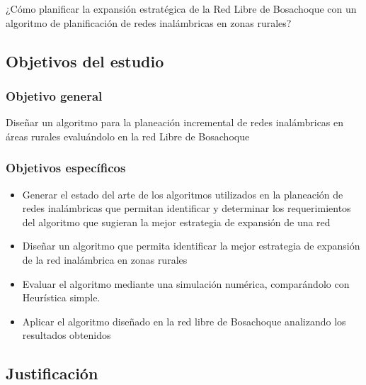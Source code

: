 \documentclass[]{article}
\begin{document}
¿Cómo planificar la expansión estratégica de la Red Libre de Bosachoque
con un algoritmo de planificación de redes inalámbricas en zonas
rurales?

\subsection{Objetivos del estudio}\label{objetivos-del-estudio}

\subsubsection{Objetivo general}\label{objetivo-general}

Diseñar un algoritmo para la planeación incremental de redes
inalámbricas en áreas rurales evaluándolo en la red Libre de Bosachoque

\subsubsection{Objetivos específicos}\label{objetivos-especuxedficos}

\begin{itemize}
\item
  Generar el estado del arte de los algoritmos utilizados en la
  planeación de redes inalámbricas que permitan identificar y determinar
  los requerimientos del algoritmo que sugieran la mejor estrategia de
  expansión de una red
\item
  Diseñar un algoritmo que permita identificar la mejor estrategia de
  expansión de la red inalámbrica en zonas rurales
\item
  Evaluar el algoritmo mediante una simulación numérica, comparándolo
  con Heurística simple.
\item
  Aplicar el algoritmo diseñado en la red libre de Bosachoque analizando
  los resultados obtenidos
\end{itemize}

\subsection{Justificación}\label{justificaciuxf3n}
\end{document}
